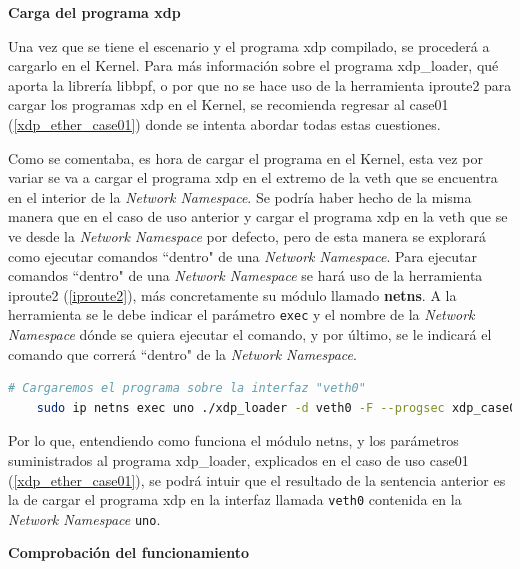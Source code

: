 \vspace{0.5cm}
\textbf{Carga del programa \gls{xdp}}\\
\par
Una vez que se tiene el escenario y el programa \gls{xdp} compilado, se procederá a cargarlo en el Kernel. Para más información sobre el programa  xdp\_loader, qué aporta la librería libbpf, o por que no se hace uso de la herramienta iproute2 para cargar los programas \gls{xdp} en el Kernel, se recomienda regresar al case01 (\ref{xdp_ether_case01})  donde se intenta abordar todas estas cuestiones.\\
\par

Como se comentaba, es hora de cargar el programa en el Kernel, esta vez por variar se va a cargar el programa \gls{xdp} en el extremo de la \gls{veth} que se encuentra en el interior de la \textit{Network Namespace}. Se podría haber hecho de la misma manera que en el caso de uso anterior y cargar el programa \gls{xdp} en la \gls{veth} que se ve desde la \textit{Network Namespace} por defecto, pero de esta manera se explorará como ejecutar comandos ``dentro" de una \textit{Network Namespace}. Para ejecutar comandos ``dentro" de una \textit{Network Namespace} se hará uso de la herramienta iproute2 (\ref{iproute2}), más concretamente su módulo llamado \textbf{netns}. A la herramienta se le debe indicar el parámetro \texttt{exec} y el nombre de la \textit{Network Namespace} dónde se quiera ejecutar el comando, y por último, se le indicará el comando que correrá ``dentro" de la \textit{Network Namespace}.

\begin{lstlisting}[language= bash, style=Consola, caption={Carga del programa XDP - Case02},label=code:case02_xdp_ether_load]
    # Cargaremos el programa sobre la interfaz "veth0" 
    sudo ip netns exec uno ./xdp_loader -d veth0 -F --progsec xdp_case02
\end{lstlisting}
\vspace{0.2cm}

Por lo que, entendiendo como funciona el módulo netns, y los parámetros suministrados al programa xdp\_loader, explicados en el caso de uso case01 (\ref{xdp_ether_case01}), se podrá intuir que el resultado de la sentencia anterior es la de cargar el programa \gls{xdp} en la interfaz llamada \texttt{veth0} contenida en la \textit{Network Namespace} \texttt{uno}.


\vspace{1.2cm}
\textbf{Comprobación del funcionamiento}\\
\par


